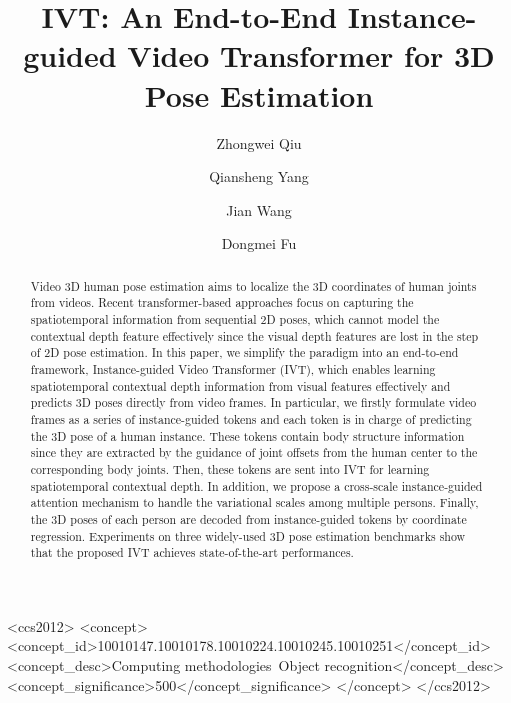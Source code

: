 \documentclass[sigconf]{acmart}
\begin{document}
\title{IVT: An End-to-End Instance-guided Video Transformer for 3D Pose Estimation}

\author{Zhongwei Qiu}


\author{Qiansheng Yang}
\authornotemark[1]

\author{Jian Wang}

\author{Dongmei Fu}

\begin{abstract}
Video 3D human pose estimation aims to localize the 3D coordinates of human joints from videos. Recent transformer-based approaches focus on capturing the spatiotemporal information from sequential 2D poses, which cannot model the contextual depth feature effectively since the visual depth features are lost in the step of 2D pose estimation. In this paper, we simplify the paradigm into an end-to-end framework, Instance-guided Video Transformer (IVT), which enables learning spatiotemporal contextual depth information from visual features effectively and predicts 3D poses directly from video frames. In particular, we firstly formulate video frames as a series of instance-guided tokens and each token is in charge of predicting the 3D pose of a human instance. These tokens contain body structure information since they are extracted by the guidance of joint offsets from the human center to the corresponding body joints. Then, these tokens are sent into IVT for learning spatiotemporal contextual depth. In addition, we propose a cross-scale instance-guided attention mechanism to handle the variational scales among multiple persons. Finally, the 3D poses of each person are decoded from instance-guided tokens by coordinate regression. Experiments on three widely-used 3D pose estimation benchmarks show that the proposed IVT achieves state-of-the-art performances.
\end{abstract}



\begin{CCSXML}
<ccs2012>
   <concept>
       <concept_id>10010147.10010178.10010224.10010245.10010251</concept_id>
       <concept_desc>Computing methodologies~Object recognition</concept_desc>
       <concept_significance>500</concept_significance>
       </concept>
 </ccs2012>
\end{CCSXML}
\end{document}
